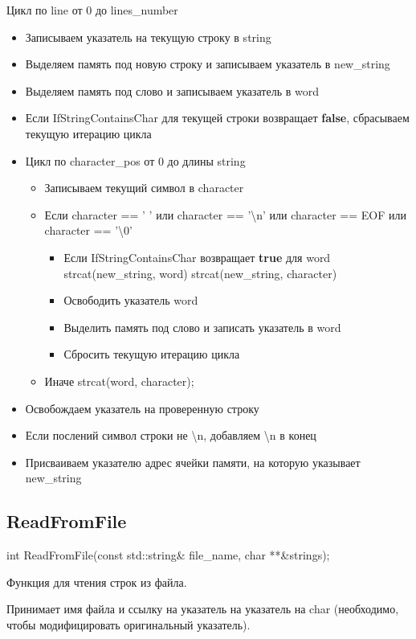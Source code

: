 \documentclass[12pt,a4paper]{article}  %
\begin{document}
	Цикл по line от 0 до lines\_number
		\begin{itemize}
			\item Записываем указатель на текущую строку в string
			\item Выделяем память под новую строку и записываем указатель в new\_string
			\item Выделяем память под слово и записываем указатель в word
			\item Если IfStringContainsChar для текущей строки возвращает \textbf{false}, сбрасываем текущую итерацию цикла
			\item Цикл по character\_pos от 0 до длины string
			\begin{itemize}
				\item Записываем текущий символ в character
				\item Если character == ' ' или character == '\textbackslash n' или character == EOF или character == '\textbackslash 0'
				\begin{itemize}
					\item Если IfStringContainsChar возвращает \textbf{true} для word
					\subitem strcat(new\_string, word)
					\subitem strcat(new\_string, character)
					\item Освободить указатель word
					\item Выделить память под слово и записать указатель в word
					\item Сбросить текущую итерацию цикла
				\end{itemize}
				\item Иначе
				\subitem strcat(word, character);
			\end{itemize}
		\item Освобождаем указатель на проверенную строку
		\item Если послений символ строки не \textbackslash n, добавляем \textbackslash n в конец
		\item Присваиваем указателю адрес ячейки памяти, на которую указывает new\_string
		\end{itemize}
	
	\subsection*{ReadFromFile}
	int ReadFromFile(const std::string\& file\_name, char **\&strings);
	
	Функция для чтения строк из файла. 
	
	Принимает имя файла и ссылку на указатель на указатель на char (необходимо, чтобы модифицировать оригинальный указатель). 
	
\end{document}
